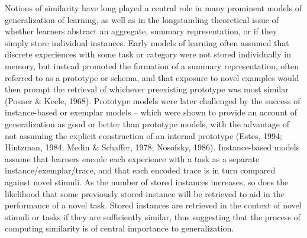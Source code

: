 \documentclass[
  man,floatsintext]{apa7}
\begin{document}
Notions of similarity have long played a central role in many prominent models of generalization of learning, as well as in the longstanding theoretical issue of whether learners abstract an aggregate, summary representation, or if they simply store individual instances. Early models of learning often assumed that discrete experiences with some task or category were not stored individually in memory, but instead promoted the formation of a summary representation, often referred to as a prototype or schema, and that exposure to novel examples would then prompt the retrieval of whichever preexisting prototype was most similar (Posner \& Keele, 1968). Prototype models were later challenged by the success of instance-based or exemplar models -- which were shown to provide an account of generalization as good or better than prototype models, with the advantage of not assuming the explicit construction of an internal prototype (Estes, 1994; Hintzman, 1984; Medin \& Schaffer, 1978; Nosofsky, 1986). Instance-based models assume that learners encode each experience with a task as a separate instance/exemplar/trace, and that each encoded trace is in turn compared against novel stimuli. As the number of stored instances increases, so does the likelihood that some previously stored instance will be retrieved to aid in the performance of a novel task. Stored instances are retrieved in the context of novel stimuli or tasks if they are sufficiently similar, thus suggesting that the process of computing similarity is of central importance to generalization.
\end{document}
